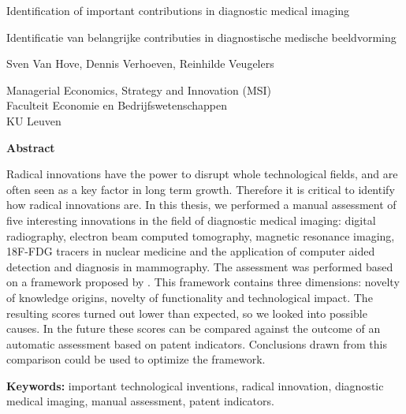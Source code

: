 
\cleardoublepage
\thispagestyle{plain}
\begin{center}
    \Huge 
    Identification of important contributions in diagnostic medical imaging
    
    \vspace{0.5cm}
    
    \large
    Identificatie van belangrijke contributies in diagnostische medische beeldvorming
    
    \vspace{1.0cm}
    
    Sven Van Hove, Dennis Verhoeven, Reinhilde Veugelers
    
    \vspace{0.5cm}
    
	Managerial Economics, Strategy and Innovation (MSI)\\
	Faculteit Economie en Bedrijfswetenschappen\\
	KU Leuven
    
    \vspace{1.0cm}
    \textbf{Abstract}
\end{center}

Radical innovations have the power to disrupt whole technological fields, and
are often seen as a key factor in long term growth. Therefore it is critical to
identify how radical innovations are. In this thesis, we performed a
manual assessment of five interesting innovations in the field of diagnostic medical
imaging: digital radiography, electron beam computed tomography, magnetic
resonance imaging, 18F-FDG tracers in nuclear medicine and the application of
computer aided detection and diagnosis in mammography. The assessment was
performed based on a framework proposed by \cite{verhoeven}. This framework
contains three dimensions: novelty of knowledge origins, novelty of
functionality  and technological impact. The resulting scores turned out lower
than expected, so we looked into possible causes. In the future these scores can
be compared against the outcome of an automatic assessment based on patent
indicators. Conclusions drawn from this comparison could be used to optimize the
framework.

\vspace{1.0cm}

\textbf{Keywords:} important technological inventions, radical innovation,
diagnostic medical imaging, manual assessment, patent indicators.